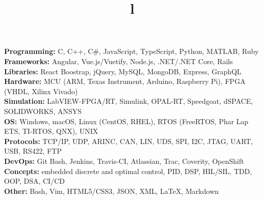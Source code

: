 \documentclass[mm]{res}
\begin{document}



\begin{resume}

\npspctoprule
\section{\headingskills}
\tb \textbf{Programming:} C, C++, C\#, JavaScript, TypeScript, Python, MATLAB, Ruby\\
\tb \textbf{Frameworks:} Angular, Vue.js/Vuetify, Node.js, .NET/.NET Core, Rails\\
\tb \textbf{Libraries:} React Boostrap, jQuery, MySQL, MongoDB, Express, GraphQL\\
\tb \textbf{Hardware:} MCU (ARM, Texas Instrument, Arduino, Raspberry Pi), FPGA (VHDL, Xilinx Vivado)\\
\tb \textbf{Simulation:} LabVIEW-FPGA/RT, Simulink, OPAL-RT, Speedgoat, dSPACE, SOLIDWORKS, ANSYS\\
\tb \textbf{OS:} Windows, macOS, Linux (CentOS, RHEL), RTOS (FreeRTOS, Phar Lap ETS, TI-RTOS, QNX), UNIX\\
\tb \textbf{Protocols:} TCP/IP, UDP, ARINC, CAN, LIN, UDS, SPI, I2C, JTAG, UART, USB, RS422, FTP\\
\tb \textbf{DevOps:} Git Bash, Jenkins, Travis-CI, Atlassian, Trac, Coverity, OpenShift\\
\tb \textbf{Concepts:} embedded discrete and optimal control, PID, DSP, HIL/SIL, TDD, OOP, DSA, CI/CD\\
\tb \textbf{Other:} Bash, Vim, HTML5/CSS3, JSON, XML, \LaTeX, Markdown


\toprule

\section{\headingeducation}
\begin{format}
\\
\title{l}\\
\end{format}


\end{resume}
\end{document}

